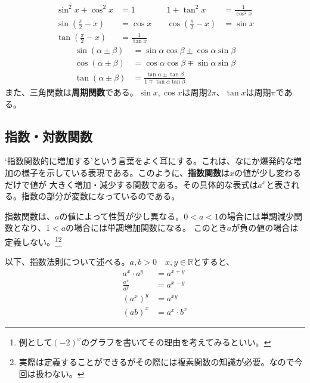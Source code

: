 \documentclass[a4j,dvipdfmx]{jsarticle}
\begin{document}
                \begin{align}
                    \sin^2 x + \cos ^2 x &= 1 &\quad 1 + \tan^2 x &= \frac{1}{\cos^2 x}\\
                    \sin\left(\frac{\pi}{2}-x\right) &= \cos x &\quad \cos\left(\frac{\pi}{2}-x\right) &= \sin x\\
                    \tan\left(\frac{\pi}{2}-x\right) &= \frac{1}{\tan x} &&
                \end{align}
                \begin{align}
                    \sin(\alpha\pm\beta) &= \sin\alpha\cos\beta \pm \cos\alpha\sin\beta\\
                    \cos(\alpha\pm\beta) &= \cos\alpha\cos\beta \mp \sin\alpha\sin\beta\\
                    \tan(\alpha\pm\beta) &= \frac{\tan\alpha\pm\tan\beta}{1\mp\tan\alpha\tan\beta}
                \end{align}
                また、三角関数は\textbf{周期関数}である。$\sin x,\cos x$は周期$2\pi$、$\tan x$は周期$\pi$である。
            \clearpage
            \subsection{指数・対数関数}
                `指数関数的に増加する'という言葉をよく耳にする。これは、なにか爆発的な増加の様子を示している表現である。このように、\textbf{指数関数}は$x$の値が少し変わるだけで値が
                大きく増加・減少する関数である。その具体的な表式は$a^x$と表される。指数の部分が変数になっているのである。

                指数関数は、$a$の値によって性質が少し異なる。$0<a<1$の場合には単調減少関数となり、$1<a$の場合には単調増加関数になる。
                このとき$a$が負の値の場合は定義しない。\footnote{例として$(-2)^x$のグラフを書いてその理由を考えてみるといい。}\footnote{実際は定義することができるがその際には複素関数の知識が必要。なので今回は扱わない。}

                以下、指数法則について述べる。$a,b>0\quad x,y\in \mathbb{R}$とすると、
                \begin{align}
                    a^x\cdot a^y&=a^{x+y}\\
                    \frac{a^x}{a^y} &= a^{x-y}\\
                    (a^x)^y &= a^{xy}\\
                    (ab)^{x} &= a^x\cdot b^x
                \end{align}
\end{document}
